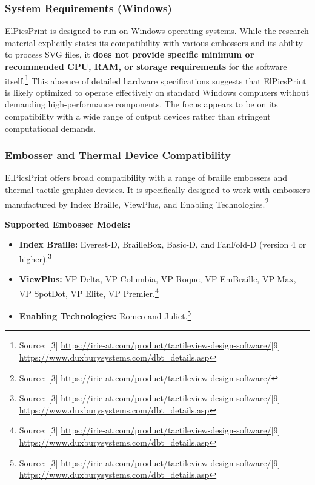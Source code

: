 \subsubsection{System Requirements (Windows)}

ElPicsPrint is designed to run on Windows operating systems. While the research material explicitly states its compatibility with various embossers and its ability to process SVG files, it \textbf{does not provide specific minimum or recommended CPU, RAM, or storage requirements} for the software itself.\footnote{Source: [3] \url{https://irie-at.com/product/tactileview-design-software/}[9] \url{https://www.duxburysystems.com/dbt_details.asp}} This absence of detailed hardware specifications suggests that ElPicsPrint is likely optimized to operate effectively on standard Windows computers without demanding high-performance components. The focus appears to be on its compatibility with a wide range of output devices rather than stringent computational demands.

\subsubsection{Embosser and Thermal Device Compatibility}

ElPicsPrint offers broad compatibility with a range of braille embossers and thermal tactile graphics devices. It is specifically designed to work with embossers manufactured by Index Braille, ViewPlus, and Enabling Technologies.\footnote{Source: [3] \url{https://irie-at.com/product/tactileview-design-software/}}

\textbf{Supported Embosser Models:}
\begin{itemize}
    \item \textbf{Index Braille:} Everest-D, BrailleBox, Basic-D, and FanFold-D (version 4 or higher).\footnote{Source: [3] \url{https://irie-at.com/product/tactileview-design-software/}[9] \url{https://www.duxburysystems.com/dbt_details.asp}}
    \item \textbf{ViewPlus:} VP Delta, VP Columbia, VP Roque, VP EmBraille, VP Max, VP SpotDot, VP Elite, VP Premier.\footnote{Source: [3] \url{https://irie-at.com/product/tactileview-design-software/}[9] \url{https://www.duxburysystems.com/dbt_details.asp}}
    \item \textbf{Enabling Technologies:} Romeo and Juliet.\footnote{Source: [3] \url{https://irie-at.com/product/tactileview-design-software/}[9] \url{https://www.duxburysystems.com/dbt_details.asp}}
\end{itemize}

